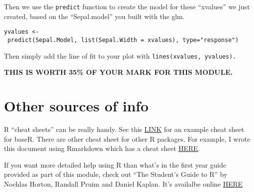 \documentclass[]{book}
\begin{document}
Then we use the \texttt{predict} function to create the model for these ``xvalues'' we just created, based on the ``Sepal.model'' you built with the glm.

\texttt{yvalues\ \textless{}-\ predict(Sepal.Model,\ list(Sepal.Width\ =\ xvalues),\ type="response")}

Then simply add the line of fit to your plot with \texttt{lines(xvalues,\ yvalues).}

\textbf{THIS IS WORTH 35\% OF YOUR MARK FOR THIS MODULE.}

\hypertarget{other-sources-of-info}{%
\chapter{Other sources of info}\label{other-sources-of-info}}

R ``cheat sheets'' can be really handy. See this \href{https://rstudio.com/wp-content/uploads/2016/05/base-r.pdf}{LINK} for an example cheat sheet for baseR. There are other cheat sheet for other R packages. For example, I wrote this document using Rmarkdown which has a cheat sheet \href{https://rstudio.com/wp-content/uploads/2015/02/rmarkdown-cheatsheet.pdf}{HERE}.

If you want more detailed help using R than what's in the first year guide provided as part of this module, check out ``The Student's Guide to R'' by Nochlas Horton, Randall Pruim and Daniel Kaplan. It's availalbe online \href{https://cran.r-project.org/doc/contrib/Horton+Pruim+Kaplan_MOSAIC-StudentGuide.pdf}{HERE}


\end{document}
